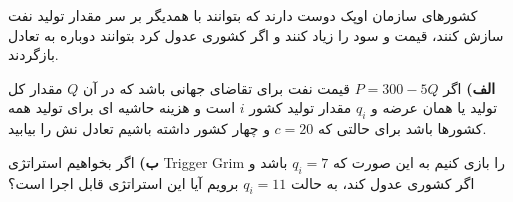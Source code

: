 کشورهای سازمان اوپک دوست دارند که بتوانند با همدیگر بر سر مقدار تولید نفت سازش کنند، قیمت و سود را زیاد کنند و اگر کشوری عدول کرد بتوانند دوباره به تعادل بازگردند.

\vspace*{10pt}
\textbf{الف)}
اگر 
$P = 300 - 5Q$ 
قیمت نفت برای تقاضای جهانی باشد که در آن 
$Q$
مقدار کل تولید یا همان عرضه و
$q_i$
مقدار تولید کشور 
$i$
است و هزینه حاشیه ای برای تولید همه کشورها باشد برای حالتی که 
$c = 20$
و چهار کشور داشته باشیم تعادل نش را بیابید.

\vspace*{5pt}
\textbf{ب)}
اگر بخواهیم استراتژی Trigger Grim را بازی کنیم به این صورت که
$q_i = 7$
باشد و اگر کشوری عدول کند، به حالت
$q_i = 11$
برویم آیا این استراتژی قابل اجرا است؟
